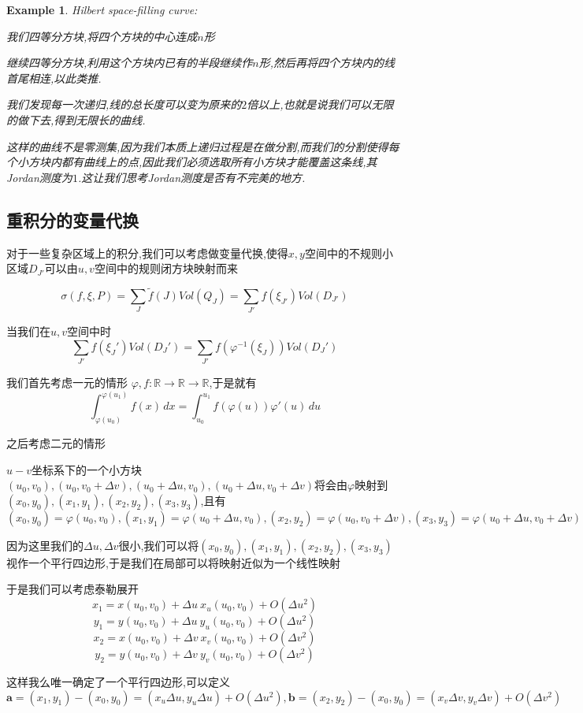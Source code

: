 \documentclass[11pt,hyperref,a4paper,UTF8]{ctexart}
\newtheorem{example}{Example}[subsection]
\newcommand{\RR}{\mathbb{R}}
\newcommand{\ve}{\boldsymbol}
\begin{document}
\begin{CJK}{UTF8}{gkai}
\begin{example}
  Hilbert space-filling curve:
  
我们四等分方块,将四个方块的中心连成$n$形

继续四等分方块,利用这个方块内已有的半段继续作$n$形,然后再将四个方块内的线首尾相连,以此类推.

我们发现每一次递归,线的总长度可以变为原来的$2$倍以上,也就是说我们可以无限的做下去,得到无限长的曲线.

这样的曲线不是零测集,因为我们本质上递归过程是在做分割,而我们的分割使得每个小方块内都有曲线上的点,因此我们必须选取所有小方块才能覆盖这条线,其Jordan测度为$1$.这让我们思考Jordan测度是否有不完美的地方.
\end{example}

\subsection{重积分的变量代换}
对于一些复杂区域上的积分,我们可以考虑做变量代换,使得$x,y$空间中的不规则小区域$D_{J'}$可以由$u,v$空间中的规则闭方块映射而来

\[\sigma(f,\xi,P) = \sum_{J} \tilde{f}(J) Vol(Q_J) = \sum_{J'} f(\xi_{J'}) Vol(D_{J'})\]

当我们在$u,v$空间中时
\[\sum_{J'} f(\xi_J') Vol(D_J') = \sum_{J'} f(\varphi^{-1}(\xi_J)) Vol(D_J')\]

我们首先考虑一元的情形
$\varphi,f: \RR \to \RR \to \RR$,于是就有
\[\int_{\varphi(u_0)}^{\varphi(u_1)}f(x)\, dx = \int_{u_0}^{u_1} f(\varphi(u)) \varphi'(u)\, du\]

之后考虑二元的情形

$u-v$坐标系下的一个小方块$(u_0,v_0),(u_0,v_0 + \Delta v),(u_0 + \Delta u,v_0),(u_0 + \Delta u, v_0 + \Delta v)$将会由$\varphi$映射到$(x_0,y_0),(x_1,y_1),(x_2,y_2),(x_3,y_3)$,且有
\[(x_0,y_0) = \varphi(u_0,v_0),(x_1,y_1) = \varphi(u_0 + \Delta u,v_0),(x_2,y_2) = \varphi(u_0,v_0 + \Delta v),(x_3,y_3) = \varphi(u_0 + \Delta u,v_0 + \Delta v)\]

因为这里我们的$\Delta u,\Delta v$很小,我们可以将$(x_0,y_0),(x_1,y_1),(x_2,y_2),(x_3,y_3)$视作一个平行四边形,于是我们在局部可以将映射近似为一个线性映射

于是我们可以考虑泰勒展开
\[x_1 = x(u_0,v_0) + \Delta u~ x_u(u_0,v_0) + O(\Delta u^2)\]
\[y_1 = y(u_0,v_0) + \Delta u~ y_u(u_0,v_0) + O(\Delta u^2)\]
\[x_2 = x(u_0,v_0) + \Delta v~ x_v(u_0,v_0) + O(\Delta v^2)\]
\[y_2 = y(u_0,v_0) + \Delta v~ y_v(u_0,v_0) + O(\Delta v^2)\]

这样我么唯一确定了一个平行四边形,可以定义
\[\ve{a} = (x_1,y_1) - (x_0,y_0) = (x_u \Delta u,y_u \Delta u) + O(\Delta u^2), \ve{b} = (x_2,y_2) - (x_0,y_0) = (x_v \Delta v,y_v \Delta v) + O(\Delta v^2)\]


\end{CJK}
\end{document}
